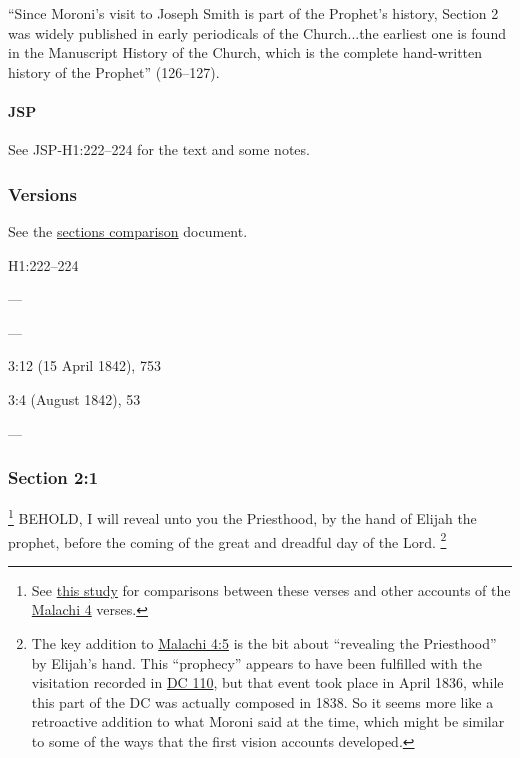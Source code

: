			``Since Moroni's visit to Joseph Smith is part of the Prophet's history, Section 2 was widely published in early periodicals of the Church...the earliest one is found in the Manuscript History of the Church, which is the complete hand-written history of the Prophet'' (126--127).
			
		\paragraph{JSP}
		
			See JSP-H1:222--224 for the text and some notes.
		
	\subsubsection{Versions}
		\label{DC2-V}
		
		See the \href{https://drive.google.com/file/d/1goAvNz8jS4R8slYfMG_db55Ty2z_vmgK/view?usp=sharing}{sections comparison} document.
	
		\begin{compactdesc}
			\item[JSP] H1:222--224
			\item[BC] ---
			\item[DC 1835] ---
			\item[TS] 3:12 (15 April 1842), 753
			\item[MS] 3:4 (August 1842), 53
			\item[DC 1844] ---
		\end{compactdesc}

	\subsubsection{Section 2:1} %
		\label{DC2-1}

			\footnote{%
				See \hyperref[EXSS-OT-MALACHI-4-VERSIONS]{this study} for comparisons between these verses and other accounts of the \hyperref[MALACHI-4]{Malachi 4} verses. 
				}%
		BEHOLD, I will reveal unto you the Priesthood, by the hand of Elijah the prophet, before the coming of the great and dreadful day of the Lord.%
			\footnote{%
				The key addition to \hyperref[MALACHI-4-5]{Malachi 4:5} is the bit about ``revealing the Priesthood'' by Elijah's hand. This ``prophecy'' appears to have been fulfilled with the visitation recorded in \hyperref[DC110]{DC 110}, but that event took place in April 1836, while this part of the DC was actually composed in 1838. So it seems more like a retroactive addition to what Moroni said at the time, which might be similar to some of the ways that the first vision accounts developed.
				}

